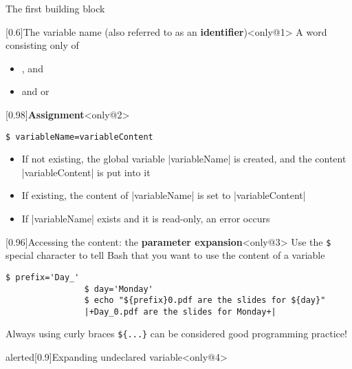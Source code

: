 \begin{frame}[fragile]{The first building block}
\begin{overlayarea}{\textwidth}{0.3\textheight}
        \vspace{-6mm}
        \begin{varblock*}{}[0.6\textwidth]{The variable name (also referred to as an \textbf{identifier})}<only@1>
            A word consisting only of
            \begin{itemize}
                \item {},  and 
                \item and  or 
            \end{itemize}
        \end{varblock*}
        \begin{varblock*}{}[0.98\textwidth]{\textbf{Assignment}}<only@2>
            \begin{lstlisting}[style=MyBash, numbers=none, xrightmargin=26mm, xleftmargin=26mm]
                $ variableName=variableContent
            \end{lstlisting}
            \begin{itemize}
                \item If not existing, the \alert{global} variable \bash|variableName| is created, and the content \bash|variableContent| is put into it
                \item If existing, the content of \bash|variableName| is set to \bash|variableContent|
                \item If \bash|variableName| exists and it is read-only, an error occurs
            \end{itemize}
        \end{varblock*}
        \begin{varblock}{}[0.96\textwidth]{Accessing the content: the \textbf{parameter expansion}}<only@3>
            Use the \texttt{\$} special character to tell Bash that you want to use the content of a variable
            \begin{lstlisting}[style=MyBash, numbers=none, belowskip=-5mm]
                $ prefix='Day_'
                $ day='Monday'
                $ echo "${prefix}0.pdf are the slides for ${day}"
                |+Day_0.pdf are the slides for Monday+|
            \end{lstlisting}
            \alert{Always} using curly braces \alert{\texttt{\$\{...\}}} can be considered \alert{good programming practice}!
        \end{varblock}
        \begin{varblock}{alerted}[0.9\textwidth]{Expanding undeclared variable}<only@4>

\end{varblock}
\end{overlayarea}
\end{frame}
